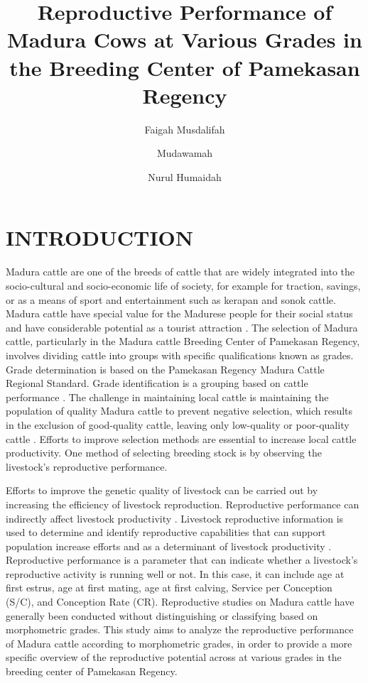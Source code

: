 \documentclass[9pt,article,twoside]{fapet-rho-class/fapet-rho}
\title{Reproductive Performance of Madura Cows at Various Grades in the Breeding Center of Pamekasan Regency}
\author[1,$*$]{Faigah Musdalifah}
\author[1]{Mudawamah}
\author[1]{Nurul Humaidah}
\affil[1]{Magister program of Animal science, Department of Animal Science, University of Islam Malang, Malang 65144, Indonesia}
\begin{document}
\maketitle
\pagestyle{fancy}\thispagestyle{firststyle}


\section{INTRODUCTION}

Madura cattle are one of the breeds of cattle that are widely integrated into the socio-cultural and socio-economic life of society, for example for traction, savings, or as a means of sport and entertainment such as kerapan and sonok cattle. Madura cattle have special value for the Madurese people for their social status and have considerable potential as a tourist attraction \citep{Zali2019}. The selection of Madura cattle, particularly in the Madura cattle Breeding Center of Pamekasan Regency, involves dividing cattle into groups with specific qualifications known as grades. Grade determination is based on the Pamekasan Regency Madura Cattle Regional Standard. Grade identification is a grouping based on cattle performance \citep{Putra2018}. The challenge in maintaining local cattle is maintaining the population of quality Madura cattle to prevent negative selection, which results in the exclusion of good-quality cattle, leaving only low-quality or poor-quality cattle \citep{Susilawati2017}. Efforts to improve selection methods are essential to increase local cattle productivity. One method of selecting breeding stock is by observing the livestock's reproductive performance.

Efforts to improve the genetic quality of livestock can be carried out by increasing the efficiency of livestock reproduction. Reproductive performance can indirectly affect livestock productivity \citep{Pariswara2021}. Livestock reproductive information is used to determine and identify reproductive capabilities that can support population increase efforts \citep{Makmur2019} and as a determinant of livestock productivity \citep{Sartika2020}. Reproductive performance is a parameter that can indicate whether a livestock's reproductive activity is running well or not. In this case, it can include age at first estrus, age at first mating, age at first calving, Service per Conception (S/C), and Conception Rate (CR). Reproductive studies on Madura cattle have generally been conducted without distinguishing or classifying based on morphometric grades. This study aims to analyze the reproductive performance of Madura cattle according to morphometric grades, in order to provide a more specific overview of the reproductive potential across at various grades in the breeding center of Pamekasan Regency.
\end{document}

